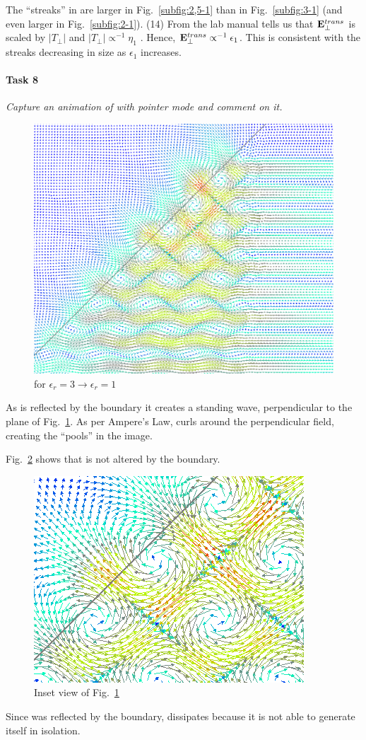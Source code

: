 The ``streaks'' in are larger in Fig.~\ref{subfig:2,5-1} than in Fig.~\ref{subfig:3-1} (and even larger in Fig.~\ref{subfig:2-1}).
(14) From the lab manual tells us that $\mathbf{E}^{trans}_{\perp}$ is scaled by $\left|T_{\perp}\right|$ and $\left|T_{\perp}\right| \propto^{-1} \eta_1$ \cite{lab-manual}.
Hence, $\mathbf{E}^{trans}_{\perp} \propto^{-1} \epsilon_1$.
This is consistent with the streaks decreasing in size as $\epsilon_1$ increases.

\paragraph{Task 8}\textit{Capture an animation of  with pointer mode and comment on it.}

\begin{figure}[tbph]
	\centering
	\includegraphics[width=0.8\linewidth]{graphics/Task8-Pointers}
	\caption{ for $\epsilon_r = 3 \rightarrow \epsilon_r = 1$}
	\label{fig:Task8-Pointers}
\end{figure}

As  is reflected by the boundary it creates a standing wave, perpendicular to the plane of Fig.~\ref{fig:Task8-Pointers}.
As per Ampere's Law,  curls around the perpendicular  field, creating the ``pools'' in the image. 

Fig.~\ref{fig:Task8-Pointers-Inset} shows that  is not altered by the boundary.
\begin{figure}[tbph]
	\centering
	\includegraphics[width=0.6\linewidth]{graphics/Task8-Pointers-Inset}
	\caption{Inset view of Fig.~\ref{fig:Task8-Pointers}}
	\label{fig:Task8-Pointers-Inset}
\end{figure}
Since  was reflected by the boundary,  dissipates because it is not able to generate itself in isolation.

